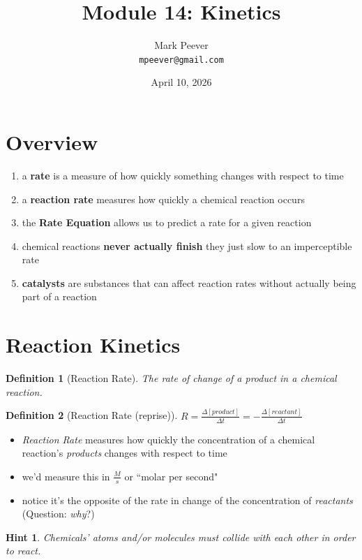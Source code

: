 \documentclass[11pt, oneside]{article}   	%
\title{Module 14: Kinetics}
\author{Mark Peever\\ \texttt{mpeever@gmail.com}}
\date{April 10, 2026}
\newtheorem{definition}{Definition}
\newtheorem{hint}{Hint}
\begin{document}
\maketitle

\section{Overview}
\begin{enumerate}
\item a \textbf{rate} is a measure of how quickly something changes with respect to time
\item a \textbf{reaction rate} measures how quickly a chemical reaction occurs
\item the \textbf{Rate Equation} allows us to predict a rate for a given reaction
\item chemical reactions \textbf{never actually finish} they just slow to an imperceptible rate
\item \textbf{catalysts} are substances that can affect reaction rates without actually being part of a reaction
\end{enumerate}

\section{Reaction Kinetics}

\begin{definition}[Reaction Rate]\label{def:reaction-rate}
The rate of change of a product in a chemical reaction.
\end{definition}

\begin{definition}[Reaction Rate (reprise)]\label{def:reaction-rate:reprise}
$R = \frac{\Delta [product]}{\Delta t} = - \frac{\Delta [reactant]}{\Delta t} $
\end{definition}

\begin{itemize}
\item \emph{Reaction Rate} measures how quickly the concentration of a chemical reaction's \emph{products} changes with respect to time
\item we'd measure this in $\frac{M}{s}$ or ``molar per second"
\item notice it's the opposite of the rate in change of the concentration of \emph{reactants} (Question: \emph{why}?)
\end{itemize}

\begin{hint}\label{hint:particle-collision}
Chemicals' atoms and/or molecules must collide with each other in order to react.
\end{hint}
\end{document}
